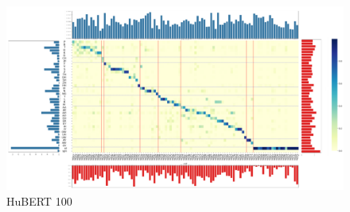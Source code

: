 
\begin{figure}\centering
    \includegraphics[width=1\linewidth]{figures/better__p_ph_given_un.png}\caption{HuBERT 100}\label{p_p_given_u-hub-100}
\end{figure}

